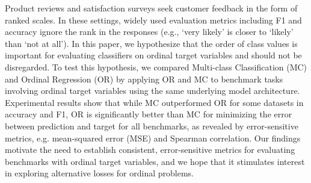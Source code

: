 Product reviews and satisfaction surveys seek customer feedback in the form of ranked scales. In these settings, widely used evaluation metrics including F1 and accuracy ignore the rank in the responses (e.g., ‘very likely' is closer to ‘likely' than ‘not at all'). In this paper, we hypothesize that the order of class values is important for evaluating classifiers on ordinal target variables and should not be disregarded. To test this hypothesis, we compared Multi-class Classification (MC) and Ordinal Regression (OR) by applying OR and MC to benchmark tasks involving ordinal target variables using the same underlying model architecture. Experimental results show that while MC outperformed OR for some datasets in accuracy and F1, OR is significantly better than MC for minimizing the error between prediction and target for all benchmarks, as revealed by error-sensitive metrics, e.g. mean-squared error (MSE) and Spearman correlation. Our findings motivate the need to establish consistent, error-sensitive metrics for evaluating benchmarks with ordinal target variables, and we hope that it stimulates interest in exploring alternative losses for ordinal problems.
